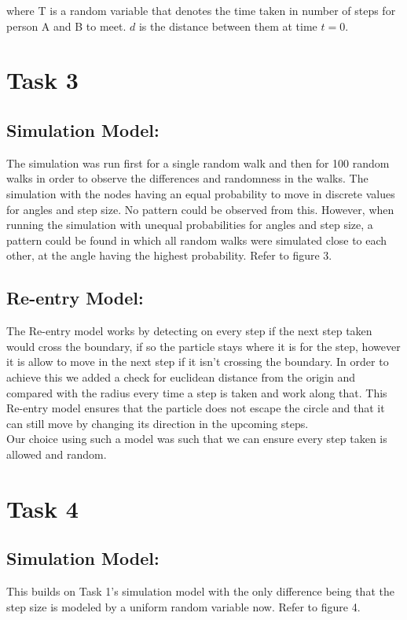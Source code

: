\documentclass[8pt]{extarticle}
\begin{document}
where T is a random variable that denotes the time taken in number of steps for person A and B to meet.
$d$ is the distance between them at time $t = 0$.


\section*{Task 3}
\subsection*{Simulation Model:}
The simulation was run first for a single random walk and then for 100 random walks in order to observe the differences and randomness in the walks. The simulation with the nodes having an equal probability to move in discrete values for angles and step size. No pattern could be observed from this. However, when running the simulation with unequal probabilities for angles and step size, a pattern could be found in which all random walks were simulated close to each other, at the angle having the highest probability.
Refer to figure 3.

\subsection*{Re-entry Model:}
The Re-entry model works by detecting on every step if the next step taken would cross the boundary, if so the particle stays where it is for the step, however it is allow to move in the next step if it isn't crossing the boundary. In order to achieve this we added a check for euclidean distance from the origin and compared with the radius every time a step is taken and work along that. This Re-entry model ensures that the particle does not escape the circle and that it can still move by changing its direction in the upcoming steps.\\
Our choice using such a model was such that we can ensure every step taken is allowed and random.


\section*{Task 4}
\subsection*{Simulation Model:}
This builds on Task 1's simulation model with the only difference being that the step size is modeled by a uniform random variable now.
Refer to figure 4.
\end{document}
